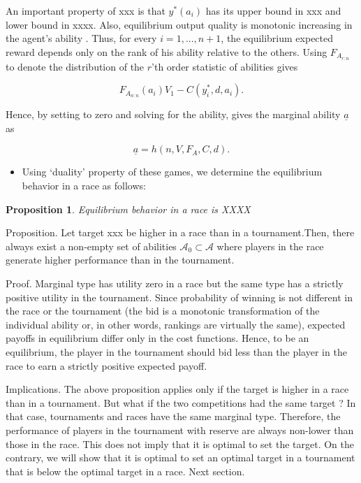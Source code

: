 \documentclass[12pt,]{article}
\providecommand{\tightlist}{%
  \setlength{\itemsep}{0pt}\setlength{\parskip}{0pt}}
\newtheorem{proposition}{Proposition}
\begin{document}
An important property of xxx is that \(y^*(a_i)\) has its upper bound in
xxx and lower bound in xxxx. Also, equilibrium output quality is
monotonic increasing in the agent's ability
\citep[see][]{moldovanu2001optimal}. Thus, for every \(i=1, ..., n+1\),
the equilibrium expected reward depends only on the rank of his ability
relative to the others. Using \({F_{A_{r:n}}}\) to denote the
distribution of the \(r\)'th order statistic of abilities gives

\begin{equation} \label{equilibrium payoffs tournament}
  {F_{A_{n:n}}}(a_i) V_1  - C(y_i^*, d, a_i).
\end{equation}

Hence, by setting to zero and solving for the ability, gives the
marginal ability \({\underline a}\) as

\begin{equation}
  {\underline a}= h(n, V, F_A, C, d).
\end{equation}

\begin{itemize}
\tightlist
\item
  Using `duality' property of these games, we determine the equilibrium
  behavior in a race as follows:
\end{itemize}

\begin{proposition}
  Equilibrium behavior in a race is XXXX
\end{proposition}

Proposition. Let target xxx be higher in a race than in a
tournament.Then, there always exist a non-empty set of abilities
\(\mathcal A_0 \subset \mathcal A\) where players in the race generate
higher performance than in the tournament.

Proof. Marginal type has utility zero in a race but the same type has a
strictly positive utility in the tournament. Since probability of
winning is not different in the race or the tournament (the bid is a
monotonic transformation of the individual ability or, in other words,
rankings are virtually the same), expected payoffs in equilibrium differ
only in the cost functions. Hence, to be an equilibrium, the player in
the tournament should bid less than the player in the race to earn a
strictly positive expected payoff.

Implications. The above proposition applies only if the target is higher
in a race than in a tournament. But what if the two competitions had the
same target ? In that case, tournaments and races have the same marginal
type. Therefore, the performance of players in the tournament with
reserve are always non-lower than those in the race. This does not imply
that it is optimal to set the target. On the contrary, we will show that
it is optimal to set an optimal target in a tournament that is below the
optimal target in a race. Next section.
\end{document}
